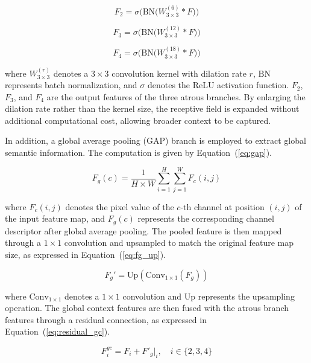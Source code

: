 \documentclass[sn-basic]{sn-jnl}
\theoremstyle{thmstyleone}%
\theoremstyle{thmstyletwo}%
\theoremstyle{thmstylethree}%
\begin{document}
\begin{equation}
F_2 = \sigma\Big(\text{BN}\big(W_{3\times 3}^{(6)} \ast F\big)\Big)
\label{eq:branch1}
\end{equation}

\begin{equation}
F_3 = \sigma\Big(\text{BN}\big(W_{3\times 3}^{(12)} \ast F\big)\Big)
\label{eq:branch2}
\end{equation}

\begin{equation}
F_4 = \sigma\Big(\text{BN}\big(W_{3\times 3}^{(18)} \ast F\big)\Big)
\label{eq:branch3}
\end{equation}

where ${W_{3\times3}^{(r)}}$ denotes a $3\times3$ convolution kernel with dilation rate $r$, $\text{BN}$ represents batch normalization, and $\sigma$ denotes the ReLU activation function. $F_2$, $F_3$, and $F_4$ are the output features of the three atrous branches. By enlarging the dilation rate rather than the kernel size, the receptive field is expanded without additional computational cost, allowing broader context to be captured.

In addition, a global average pooling (GAP) branch \cite{Jadon2025Grasp} is employed to extract global semantic information. The computation is given by Equation~(\ref{eq:gap}).

\begin{equation}
F_g(c) = \frac{1}{H \times W} \sum_{i=1}^{H} \sum_{j=1}^{W} F_c(i,j)
\label{eq:gap}
\end{equation}

where $F_c(i,j)$ denotes the pixel value of the $c$-th channel at position $(i,j)$ of the input feature map, and $F_g(c)$ represents the corresponding channel descriptor after global average pooling. The pooled feature is then mapped through a $1\times1$ convolution and upsampled to match the original feature map size, as expressed in Equation~(\ref{eq:fg_up}).

\begin{equation}
F_g' = \text{Up}(\text{Conv}_{1\times1}(F_g))
\label{eq:fg_up}
\end{equation}

where $\text{Conv}_{1\times1}$ denotes a $1\times1$ convolution and $\text{Up}$ represents the upsampling operation. The global context features are then fused with the atrous branch features through a residual connection, as expressed in Equation~(\ref{eq:residual_gc}).

\begin{equation}
F_i^{gc} = F_i + F'_g|_i, \quad i \in \{2,3,4\}
\label{eq:residual_gc}
\end{equation}
\end{document}
